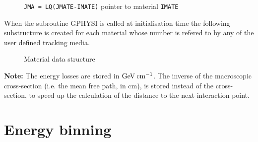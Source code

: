              

\begin{figure}[hbt]
      \centering
      \caption{{\tt JMA = LQ(JMATE-IMATE)} pointer to material {\tt IMATE}}
      \label{cons199-1}
\end{figure}

When the subroutine GPHYSI is called at initialisation time the
following substructure is created for each material whose number
is refered to by any of the user defined tracking media.

\begin{figure}[p]
      \centering
      \caption{Material data structure}
      \label{cons199-2}
\end{figure}

{\bf Note:}
The energy losses are stored in ${\rm GeV \: cm^{-1}}$. The inverse of
the macroscopic cross-section (i.e. the mean free path, in cm), is stored
instead of the cross-section, to speed up the calculation of the distance
to the next interaction point.
 
\section{Energy binning}
 
